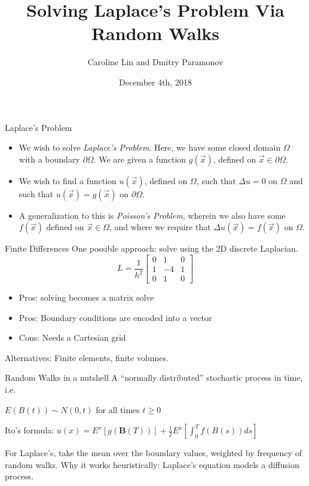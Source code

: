 \documentclass{beamer}
\title{Solving Laplace's Problem Via Random Walks}
\author{Caroline Lin and Dmitry Paramonov}
\date{December 4th, 2018}
\newcommand\di{\partial}
\newcommand\pars[1]{\left(#1\right)}
\begin{document}
\begin{frame}
  \titlepage%
\end{frame}
\begin{frame}{Laplace's Problem}
\begin{itemize}
\item We wish to solve \emph{Laplace's Problem}.
Here, we have some closed domain $\Omega$ with a boundary $\di\Omega$.
We are given a function $g\pars{\vec{x}}$, defined on $\vec{x}\in\di\Omega$.
\item We wish to find a function $u\pars{\vec{x}}$, defined on $\Omega$,
such that $\Delta u=0$ on $\Omega$
and such that $u\pars{\vec{x}}=g\pars{\vec{x}}$ on $\di\Omega$.
\item A generalization to this is \emph{Poisson's Problem},
wherein we also have some $f\pars{\vec{x}}$ defined on $\vec{x}\in\Omega$,
and where we require that $\Delta u\pars{\vec{x}}=f\pars{\vec{x}}$ on $\Omega$.
\end{itemize}
\end{frame}

\begin{frame}{Finite Differences}
One possible approach: solve using the 2D discrete Laplacian.
	\[ L = \frac{1}{h^2} \begin{bmatrix}
		0 & 1 & 0 \\
		1 & -4& 1 \\
		0 & 1 & 0
	\end{bmatrix} \]
\begin{itemize}
\item Pros: solving becomes a matrix solve
\item Pros: Boundary conditions are encoded into a vector
\item Cons: Needs a Cartesian grid
\end{itemize}

Alternatives: Finite elements, finite volumes.
\end{frame}
\begin{frame}{Random Walks in a nutshell}
A ``normally distributed'' stochastic process in time, i.e.

$E(B(t)) \sim N(0, t)$ for all times $t \geq 0$

Ito's formula:
$u(x) = E^x[ g(\mathbf{B}(T))] + \frac{1}{2} E^x \left[ \int_0^T f(B(s))ds \right]$

For Laplace's, take the mean over the boundary values, weighted by frequency of random walks.
Why it works heuristically: Laplace's equation models a diffusion process. 
\end{frame}
\end{document}
